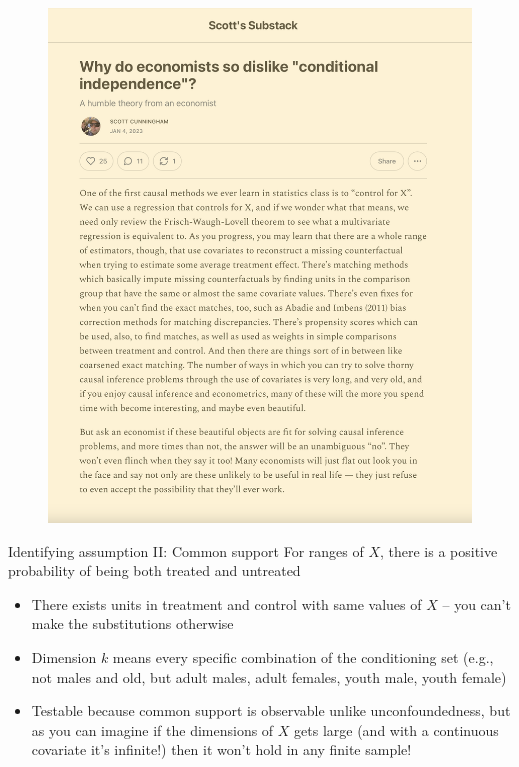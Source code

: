 \documentclass{beamer}
\begin{document}
\begin{frame}{}

  \begin{figure}
    \includegraphics[scale=0.25]{./lecture_includes/disliking_controls}
  \end{figure}

\end{frame}







\begin{frame}[plain]

	\begin{block}{Identifying assumption II: Common support}
	For ranges of $X$, there is a positive probability of being both treated and untreated
	\end{block}
	
	\begin{itemize}
	\item There exists units in treatment and control with same values of $X$ -- you can't make the substitutions otherwise
	\item Dimension $k$ means every specific combination of the conditioning set (e.g., not males and old, but adult males, adult females, youth male, youth female)
	\item Testable because common support is observable unlike unconfoundedness, but as you can imagine if the dimensions of $X$ gets large (and with a continuous covariate it's infinite!) then it won't hold in any finite sample!
	\end{itemize}
	
	
\end{frame}
\end{document}
